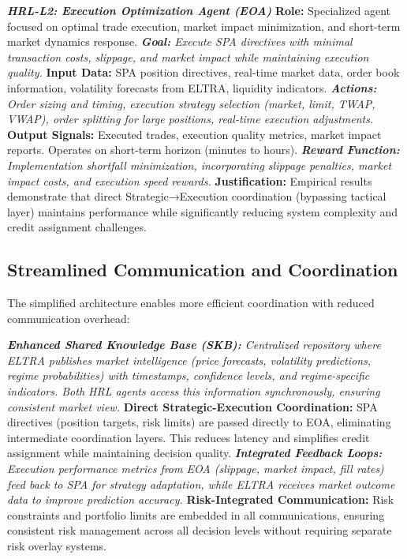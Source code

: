 \documentclass[11pt,a4paper]{article}
\begin{document}
\textit{   \textbf{HRL-L2: Execution Optimization Agent (EOA)}
    }   \textbf{Role:} Specialized agent focused on optimal trade execution, market impact minimization, and short-term market dynamics response.
    \textit{   \textbf{Goal:} Execute SPA directives with minimal transaction costs, slippage, and market impact while maintaining execution quality.
    }   \textbf{Input Data:} SPA position directives, real-time market data, order book information, volatility forecasts from ELTRA, liquidity indicators.
    \textit{   \textbf{Actions:} Order sizing and timing, execution strategy selection (market, limit, TWAP, VWAP), order splitting for large positions, real-time execution adjustments.
    }   \textbf{Output Signals:} Executed trades, execution quality metrics, market impact reports. Operates on short-term horizon (minutes to hours).
    \textit{   \textbf{Reward Function:} Implementation shortfall minimization, incorporating slippage penalties, market impact costs, and execution speed rewards.
    }   \textbf{Justification:} Empirical results demonstrate that direct Strategic→Execution coordination (bypassing tactical layer) maintains performance while significantly reducing system complexity and credit assignment challenges.

\subsection{Streamlined Communication and Coordination}

The simplified architecture enables more efficient coordination with reduced communication overhead:

\textit{   \textbf{Enhanced Shared Knowledge Base (SKB):} Centralized repository where ELTRA publishes market intelligence (price forecasts, volatility predictions, regime probabilities) with timestamps, confidence levels, and regime-specific indicators. Both HRL agents access this information synchronously, ensuring consistent market view.
}   \textbf{Direct Strategic-Execution Coordination:} SPA directives (position targets, risk limits) are passed directly to EOA, eliminating intermediate coordination layers. This reduces latency and simplifies credit assignment while maintaining decision quality.
\textit{   \textbf{Integrated Feedback Loops:} Execution performance metrics from EOA (slippage, market impact, fill rates) feed back to SPA for strategy adaptation, while ELTRA receives market outcome data to improve prediction accuracy.
}   \textbf{Risk-Integrated Communication:} Risk constraints and portfolio limits are embedded in all communications, ensuring consistent risk management across all decision levels without requiring separate risk overlay systems.
\end{document}
